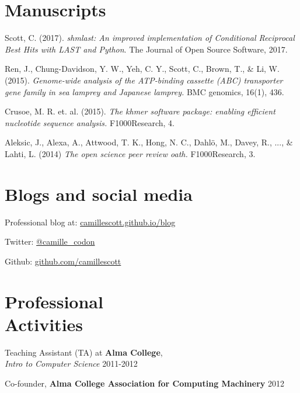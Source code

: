\documentclass[margin,12pt]{camille_resume}
\begin{document}
\begin{resume}


\section{\mysidestyle Manuscripts}

Scott, C. (2017). {\em shmlast: An improved implementation of Conditional Reciprocal Best Hits with LAST and Python}. The Journal of Open Source Software, 2017.

Ren, J., Chung-Davidson, Y. W., Yeh, C. Y., Scott, C., Brown, T., \& Li, W. (2015). 
{\em Genome-wide analysis of the ATP-binding cassette (ABC) transporter gene family in sea lamprey and Japanese lamprey.} BMC genomics, 16(1), 436.

Crusoe, M. R. et. al. (2015). {\em The khmer software package: enabling efficient nucleotide sequence analysis.} F1000Research, 4.

Aleksic, J., Alexa, A., Attwood, T. K., Hong, N. C., Dahlö, M., Davey, R., ..., \& Lahti, L. (2014)
{\em The open science peer review oath.} F1000Research, 3.

\section{\mysidestyle Blogs and social media}

Professional blog at: \href{http://camillescott.github.io/blog/}{camillescott.github.io/blog}  

Twitter: \href{http://twitter.com/camille\_codon}{@camille\_codon}

Github: \href{https://github.com/camillescott}{github.com/camillescott}

    \section{\mysidestyle Professional\\Activities}

\begin{list1}
\item[] Teaching Assistant (TA) at {\bf Alma College},\\
{\em Intro to Computer Science} \hfill 2011-2012\\

\item[] Co-founder, {\bf Alma College Association for Computing Machinery} \hfill 2012\\


\end{list1}
\end{resume}
\end{document}
